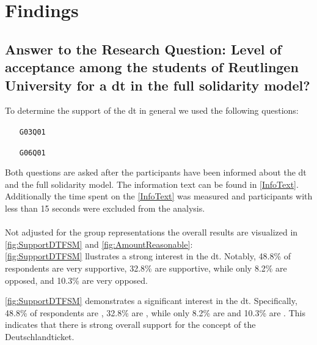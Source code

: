 \pagebreak
\section{Findings}
\subsection{Answer to the Research Question: Level of acceptance among the students of Reutlingen University for a \gls{dt} in the full solidarity model?}
\begin{center}
\end{center}

To determine the support of the \gls{dt} in general we used the following questions:

\begin{enumerate}
    \item[\texttt{G03Q01}] 
    \item[\texttt{G06Q01}] 
\end{enumerate}
Both questions are asked after the participants have been informed about the \gls{dt} and the full solidarity model. The information text can be found in \ref{InfoText}. Additionally the time spent on the \ref*{InfoText} was measured and participants with less than 15 seconds were excluded from the analysis.\\\\
Not adjusted for the group representations the overall results are visualized in \ref{fig:SupportDTFSM} and \ref{fig:AmountReasonable}:\\
\ref{fig:SupportDTFSM} llustrates a strong interest in the \gls{dt}. Notably, 48.8\% of respondents are very supportive, 32.8\% are supportive, while only 8.2\% are opposed, and 10.3\% are very opposed.

\ref{fig:SupportDTFSM} demonstrates a significant interest in the \gls{dt}. Specifically, 48.8\% of respondents are , 32.8\% are , while only 8.2\% are  and 10.3\% are . This indicates that there is strong overall support for the concept of the Deutschlandticket.

